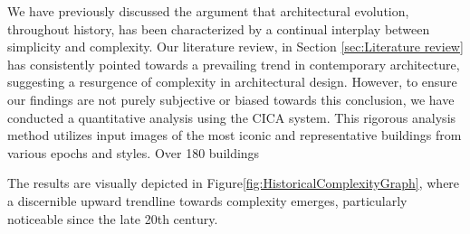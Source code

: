 %    


We have previously discussed the argument that architectural evolution, throughout history, has been characterized by a continual interplay between simplicity and complexity.
Our literature review, in Section \ref{sec:Literature review} has consistently pointed towards a prevailing trend in contemporary architecture, suggesting a resurgence of complexity in architectural design.
However, to ensure our findings are not purely subjective or biased towards this conclusion, we have conducted a quantitative analysis using the CICA system.
This rigorous analysis method utilizes input images of the most iconic and representative buildings from various epochs and styles.
Over 180 buildings

The results are visually depicted in Figure\ref{fig:HistoricalComplexityGraph}, where a discernible upward trendline towards complexity emerges, particularly noticeable since the late 20th century.











